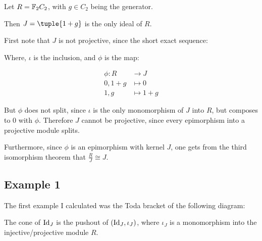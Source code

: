Let \( R = {\mathbb{F}}_2C_2 \), with \( g \in C_2 \) being the generator.

Then \( J = \tuple{1 + g} \) is the only ideal of \( R \).

First note that \( J \) is not projective, since the short exact sequence:

\begin{center}
\end{center}

Where, \( \iota \) is the inclusion, and \( \phi \) is the map:

\begin{align*}
    \phi: R &\to J \\
    0, 1 + g &\mapsto 0 \\
    1, g &\mapsto 1 + g
\end{align*}

But \( \phi \) does not split, since \( \iota \) is the only monomorphism of \( J \) into \( R \), but composes to \( 0 \) with \( \phi \). Therefore \( J \) cannot be projective, since every epimorphism into a projective module splits.

Furthermore, since \( \phi \) is an epimorphism with kernel \( J \), one gets from the third isomorphism theorem that \( \frac{R}{J} \cong J \).

\subsection{Example 1}

The first example I calculated was the Toda bracket of the following diagram:

\begin{center}
\end{center}

The cone of \( \operatorname{Id}_J \) is the pushout of \( (\operatorname{Id}_J, \iota_J) \), where \( \iota_J \) is a monomorphism into the injective/projective module \( R \).

